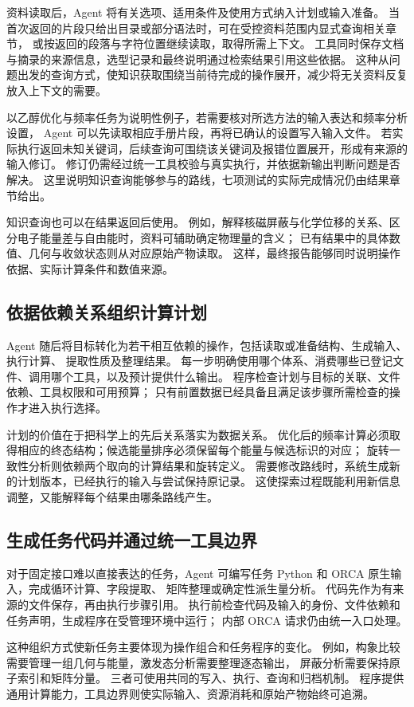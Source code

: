 \documentclass[UTF8,fontset=fandol,a4paper,11pt]{ctexart}
\begin{document}
资料读取后，Agent 将有关选项、适用条件及使用方式纳入计划或输入准备。%
当首次返回的片段只给出目录或部分语法时，可在受控资料范围内显式查询相关章节，%
或按返回的段落与字符位置继续读取，取得所需上下文。%
工具同时保存文档与摘录的来源信息，选型记录和最终说明通过检索结果引用这些依据。%
这种从问题出发的查询方式，使知识获取围绕当前待完成的操作展开，减少将无关资料反复放入上下文的需要。

以乙醇优化与频率任务为说明性例子，若需要核对所选方法的输入表达和频率分析设置，%
Agent 可以先读取相应手册片段，再将已确认的设置写入输入文件。%
若实际执行返回未知关键词，后续查询可围绕该关键词及报错位置展开，形成有来源的输入修订。%
修订仍需经过统一工具校验与真实执行，并依据新输出判断问题是否解决。%
这里说明知识查询能够参与的路线，七项测试的实际完成情况仍由结果章节给出。

知识查询也可以在结果返回后使用。%
例如，解释核磁屏蔽与化学位移的关系、区分电子能量差与自由能时，资料可辅助确定物理量的含义；%
已有结果中的具体数值、几何与收敛状态则从对应原始产物读取。%
这样，最终报告能够同时说明操作依据、实际计算条件和数值来源。

\subsection{依据依赖关系组织计算计划}
Agent 随后将目标转化为若干相互依赖的操作，包括读取或准备结构、生成输入、执行计算、%
提取性质及整理结果。%
每一步明确使用哪个体系、消费哪些已登记文件、调用哪个工具，以及预计提供什么输出。%
程序检查计划与目标的关联、文件依赖、工具权限和可用预算；%
只有前置数据已经具备且满足该步骤所需检查的操作才进入执行选择。

计划的价值在于把科学上的先后关系落实为数据关系。%
优化后的频率计算必须取得相应的终态结构；候选能量排序必须保留每个能量与候选标识的对应；%
旋转一致性分析则依赖两个取向的计算结果和旋转定义。%
需要修改路线时，系统生成新的计划版本，已经执行的输入与尝试保持原记录。%
这使探索过程既能利用新信息调整，又能解释每个结果由哪条路线产生。

\subsection{生成任务代码并通过统一工具边界}
对于固定接口难以直接表达的任务，Agent 可编写任务 Python 和 ORCA 原生输入，完成循环计算、字段提取、%
矩阵整理或确定性派生量分析。%
代码先作为有来源的文件保存，再由执行步骤引用。%
执行前检查代码及输入的身份、文件依赖和任务声明，生成程序在受管理环境中运行；%
内部 ORCA 请求仍由统一入口处理。

这种组织方式使新任务主要体现为操作组合和任务程序的变化。%
例如，构象比较需要管理一组几何与能量，激发态分析需要整理逐态输出，%
屏蔽分析需要保持原子索引和矩阵分量。%
三者可使用共同的写入、执行、查询和归档机制。%
程序提供通用计算能力，工具边界则使实际输入、资源消耗和原始产物始终可追溯。
\end{document}
